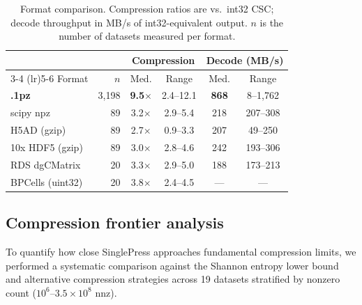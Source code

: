 \documentclass[10pt,twocolumn,letterpaper]{article}
\begin{document}
\begin{table}[t]
\centering
\caption{Format comparison. Compression ratios are vs.\ int32 CSC; decode throughput in MB/s of int32-equivalent output. $n$ is the number of datasets measured per format.}
\label{tab:formats}
\footnotesize
\begin{tabular}{l r cc cc}
\toprule
 & & \multicolumn{2}{c}{Compression} & \multicolumn{2}{c}{Decode (MB/s)} \\
\cmidrule(lr){3-4} \cmidrule(lr){5-6}
Format & $n$ & Med. & Range & Med. & Range \\
\midrule
\textbf{.1pz}      & 3{,}198 & \textbf{9.5}$\times$ & 2.4--12.1 & \textbf{868} & 8--1{,}762 \\
scipy npz           & 89 & 3.2$\times$ & 2.9--5.4 & 218 & 207--308 \\
H5AD (gzip)         & 89 & 2.7$\times$ & 0.9--3.3 & 207 & 49--250 \\
10x HDF5 (gzip)     & 89 & 3.0$\times$ & 2.8--4.6 & 242 & 193--306 \\
RDS dgCMatrix       & 20 & 3.3$\times$ & 2.9--5.0 & 188 & 173--213 \\
BPCells (uint32)    & 20 & 3.8$\times$ & 2.4--4.5 & --- & --- \\
\bottomrule
\end{tabular}
\end{table}


\subsection{Compression frontier analysis}

To quantify how close SinglePress approaches fundamental compression limits, we performed a systematic comparison against the Shannon entropy lower bound and alternative compression strategies across 19 datasets stratified by nonzero count ($10^6$--$3.5 \times 10^8$ nnz).
\end{document}

